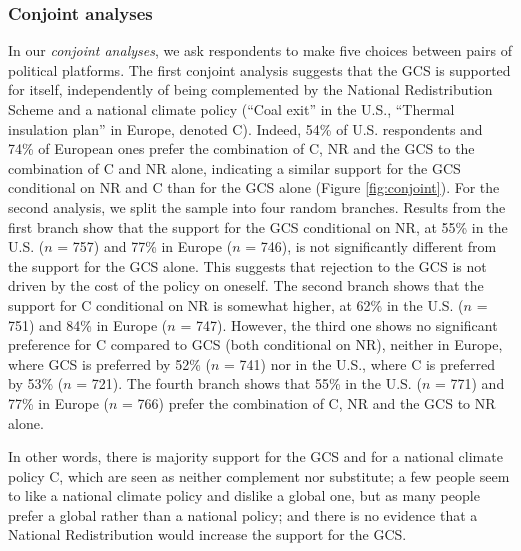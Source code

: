 \subsubsection{Conjoint analyses}\label{subsubsec:conjoint} %
In our \textit{conjoint analyses}, we ask respondents to make five choices between pairs of political platforms. The first conjoint analysis suggests that the GCS is supported for itself, independently of being complemented by the National Redistribution Scheme and a national climate policy (``Coal exit'' in the U.S., ``Thermal insulation plan'' in Europe, denoted C). Indeed, 54\% of %
U.S. respondents and 74\% of %
European ones prefer the combination of C, NR and the GCS to the combination of C and NR alone, indicating a similar support for the GCS conditional on NR and C than for the GCS alone (Figure \ref{fig:conjoint}). %
For the second analysis, we split the sample into four random branches. Results from the first branch show that the support for the GCS conditional on NR, at 55\% in the U.S. ($n$ = 757) and 77\% in Europe ($n$ = 746), is not significantly different from the support for the GCS alone. This suggests that rejection to the GCS is not driven by the cost of the policy on oneself. The second branch shows that the support for C conditional on NR is somewhat higher, at 62\% in the U.S. ($n$ = 751) and 84\% in Europe ($n$ = 747). However, the third one shows no significant preference for C compared to GCS (both conditional on NR), neither in Europe, where GCS is preferred by 52\% ($n$ = 741) nor in the U.S., where C is preferred by 53\% ($n$ = 721). The fourth branch shows that 55\% in the U.S. ($n$ = 771) and 77\% in Europe ($n$ = 766) prefer the combination of C, NR and the GCS to NR alone. %

In other words, there is majority support for the GCS and for a national climate policy C, which are seen as neither complement nor substitute; a few people seem to like a national climate policy and dislike a global one, but as many people prefer a global rather than a national policy; and there is no evidence that a National Redistribution would increase the support for the GCS. %

